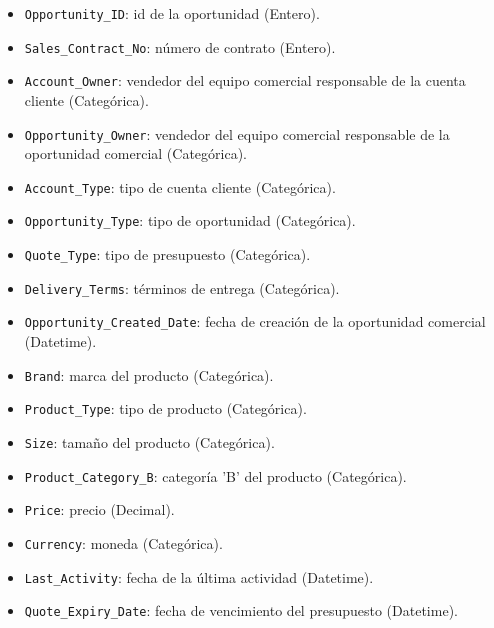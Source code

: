 \documentclass[titlepage,a4paper]{article}
\begin{document}
\begin{itemize}
    \item \verb|Opportunity_ID|: id de la oportunidad (Entero).

    \item \verb|Sales_Contract_No|: número de contrato (Entero).

    \item \verb|Account_Owner|: vendedor del equipo comercial responsable de la cuenta cliente (Categórica).

    \item \verb|Opportunity_Owner|: vendedor del equipo comercial responsable de la oportunidad comercial (Categórica).

    \item \verb|Account_Type|: tipo de cuenta cliente (Categórica).

    \item \verb|Opportunity_Type|: tipo de oportunidad (Categórica).

    \item \verb|Quote_Type|: tipo de presupuesto (Categórica).

    \item \verb|Delivery_Terms|: términos de entrega (Categórica).

    \item \verb|Opportunity_Created_Date|: fecha de creación de la oportunidad comercial (Datetime).

    \item \verb|Brand|: marca del producto (Categórica).

    \item \verb|Product_Type|: tipo de producto (Categórica).

    \item \verb|Size|: tamaño del producto (Categórica).

    \item \verb|Product_Category_B|: categoría 'B' del producto (Categórica).

    \item \verb|Price|: precio (Decimal).

    \item \verb|Currency|: moneda (Categórica).

    \item \verb|Last_Activity|: fecha de la última actividad (Datetime).

    \item \verb|Quote_Expiry_Date|: fecha de vencimiento del presupuesto (Datetime).


\end{itemize}
\end{document}
